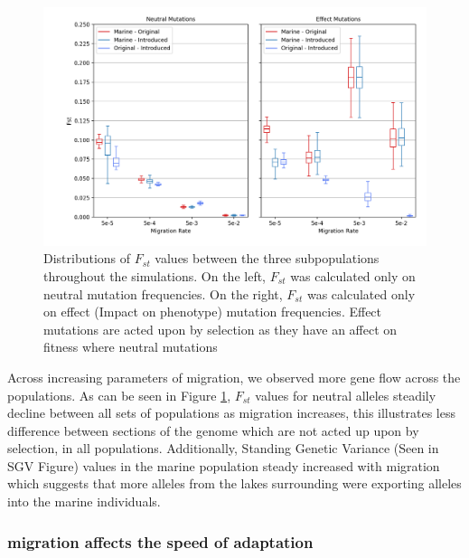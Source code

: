 \documentclass{article}
\begin{document}
\begin{figure}[htb]
	\begin{center}
  		\includegraphics[width=01.0\linewidth]{matplotlib/Fst.png}
  		\caption{Distributions of $F_{st}$  values between the three subpopulations throughout the simulations.
		On the left, $F_{st}$ was calculated only on neutral mutation frequencies. On the right, $F_{st}$ was calculated
		only on effect (Impact on phenotype) mutation frequencies. 
		Effect mutations are acted upon by selection as they have an affect on fitness where neutral mutations  }
  		\label{fig:Fst}
	\end{center}
\end{figure}

Across increasing parameters of migration, we observed more gene flow across the populations. 
As can be seen in Figure \ref{fig:Fst},
$F_{st}$ values for neutral alleles steadily decline between all sets of populations as 
migration increases, this illustrates less difference between sections of the genome which are not acted up 
upon by selection, in all populations.
Additionally, Standing Genetic Variance 
(Seen in SGV Figure)
values in the marine population steady increased with migration which suggests that more alleles from the 
lakes surrounding were exporting alleles into the marine individuals.


\subsubsection*{migration affects the speed of adaptation}
\end{document}
